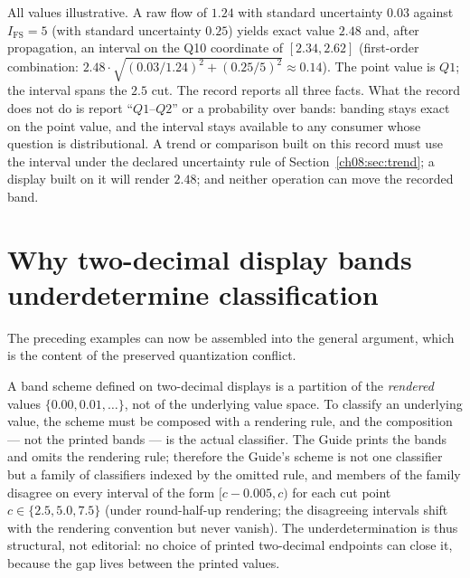 \begin{example}\label{ch08:ex:straddle}
All values illustrative. A raw flow of $1.24$ with standard
uncertainty $0.03$ against $I_{\mathrm{FS}} = 5$ (with standard
uncertainty $0.25$) yields exact value $2.48$ and, after propagation, an
interval on the Q10 coordinate of $[2.34, 2.62]$ (first-order
combination: $2.48\cdot\sqrt{(0.03/1.24)^2 + (0.25/5)^2} \approx 0.14$). The point
value is $Q1$; the interval spans the $2.5$ cut. The record reports
all three facts. What the record does not do is report ``$Q1$--$Q2$''
or a probability over bands: banding stays exact on the point value,
and the interval stays available to any consumer whose question is
distributional. A trend or comparison built on this record must use
the interval under the declared uncertainty rule of
Section~\ref{ch08:sec:trend}; a display built on it will render
$2.48$; and neither operation can move the recorded band.
\end{example}

\section{Why two-decimal display bands underdetermine classification}\label{ch08:sec:underdetermine}

The preceding examples can now be assembled into the general argument,
which is the content of the preserved quantization conflict.

A band scheme defined on two-decimal displays is a partition of the
\emph{rendered} values $\{0.00, 0.01, \ldots\}$, not of the underlying
value space. To classify an underlying value, the scheme must be composed
with a rendering rule, and the composition --- not the printed bands ---
is the actual classifier. The Guide prints the bands and omits the
rendering rule; therefore the Guide's scheme is not one classifier but a
family of classifiers indexed by the omitted rule, and members of the
family disagree on every interval of the form
$[c - 0.005, c)$ for each cut point $c \in \{2.5, 5.0, 7.5\}$ (under
round-half-up rendering; the disagreeing intervals shift with the
rendering convention but never vanish). The underdetermination is thus
structural, not editorial: no choice of printed two-decimal endpoints can
close it, because the gap lives between the printed values.

